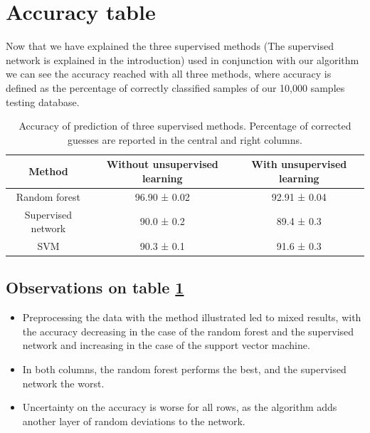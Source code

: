 \documentclass[a4paper]{report}
\begin{document}
\section{Accuracy table}

Now that we have explained the three supervised methods (The supervised network is explained in the introduction) used in conjunction with our algorithm we can see the accuracy reached with all three methods, where accuracy is defined as the percentage of correctly classified samples of our 10,000 samples testing database.

\begin{table}[h!]
  \begin{center}
    \begin{tabular}{c|c|c} %
      \textbf{Method} & \textbf{Without unsupervised learning} & \textbf{With unsupervised learning}\\
      \hline
      Random forest & 96.90  ± 0.02 & 92.91 ± 0.04\\
      Supervised network & 90.0 ± 0.2 & 89.4 ± 0.3 \\
      SVM & 90.3 ± 0.1 & 91.6 ± 0.3 \\
    \end{tabular}
  \end{center}
  \caption{Accuracy of prediction of three supervised methods. Percentage of corrected guesses are reported in the central and right columns.}
  \label{bbb}
\end{table}

\subsection{Observations on table \ref{bbb}}

\begin{itemize}
    \item Preprocessing the data with the method illustrated led to mixed results, with the accuracy decreasing in the case of the random forest and the supervised network and increasing in the case of the support vector machine.
    \item In both columns, the random forest performs the best, and the supervised network the worst.
    \item Uncertainty on the accuracy is worse for all rows, as the algorithm adds another layer of random deviations to the network.
\end{itemize}
\end{document}
